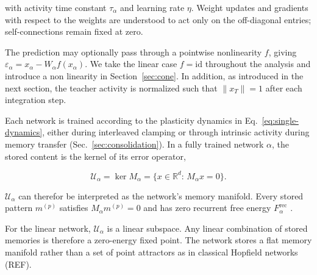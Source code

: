 \documentclass[10pt,letterpaper]{article}
\theoremstyle{plain}
\theoremstyle{remark}
\begin{document}
with activity time constant $\tau_\alpha$ and learning rate $\eta$. Weight updates and gradients with respect to the weights are understood to act only on the off-diagonal entries; self-connections remain fixed at zero.

The prediction may optionally pass through a pointwise nonlinearity $f$, giving $\varepsilon_\alpha=x_\alpha-W_\alpha f(x_\alpha)$. We take the linear case $f=\mathrm{id}$ throughout the analysis and introduce a non linearity in Section~\ref{sec:cone}.
In addition, as introduced in the next section, the teacher activity is normalized such that $\|x_T\|=1$ after each integration step.


Each network is trained according to the plasticity dynamics in Eq.~\eqref{eq:single-dynamics}, either during interleaved clamping or through intrinsic activity during memory transfer (Sec.~\ref{sec:consolidation}).
In a fully trained network $\alpha$, the stored content is the kernel of its error operator,

\begin{equation}
\mathcal U_\alpha=\ker M_\alpha=\{x\in\mathbb R^d:\,M_\alpha x=0\}.
\label{eq:manifold-kernel}
\end{equation}

$\mathcal U_\alpha$ can therefor be interpreted as the network's memory manifold. Every stored pattern $m^{(p)}$ satisfies $M_\alpha m^{(p)}=0$ and has zero recurrent free energy $F_\alpha^{\mathrm{rec}}$ \cite{tang2023covpcn}.

For the linear network, $\mathcal U_\alpha$ is a linear subspace. Any linear combination of stored memories is therefore a zero-energy fixed point. The network stores a flat memory manifold rather than a set of point attractors as in classical Hopfield networks (REF).
\end{document}
